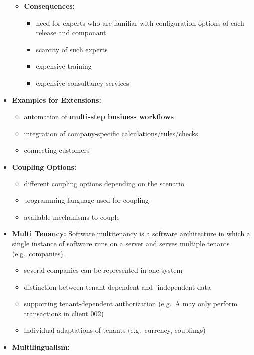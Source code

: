 \documentclass[ieeetran]{article}
\begin{document}
\begin{itemize}
\begin{itemize}
\begin{itemize}
			  \end{itemize}
		  \item \textbf{Consequences:} 
				  \begin{itemize}
				    \item need for experts who are familiar with configuration options of each release and componant
					   \item scarcity of such experts
						   \item expensive training
							   \item expensive consultancy services
				  \end{itemize}
		\end{itemize}

\item \textbf{Examples for Extensions:}
	\begin{itemize}
	  \item automation of \textbf{multi-step business workflows}
	\item integration of company-specific calculations/rules/checks
	\item connecting customers
	\end{itemize}
\item \textbf{Coupling Options:}
	\begin{itemize}
	  \item different coupling options depending on the scenario
	\item programming language used for coupling
	\item available mechanisms to couple
	\end{itemize}

\item \textbf{Multi Tenancy:} Software multitenancy is a software architecture in which a single instance of software runs on a server and serves multiple tenants (e.g.\ companies).
	\begin{itemize}
	  \item several companies can be represented in one system
	\item distinction between tenant-dependent and -independent data
	\item supporting tenant-dependent authorization (e.g.\ A may only perform transactions in client 002)
         \item individual adaptations of tenants (e.g.\ currency, couplings)
	\end{itemize}

\item \textbf{Multilingualism:}


\end{itemize}
\end{document}
